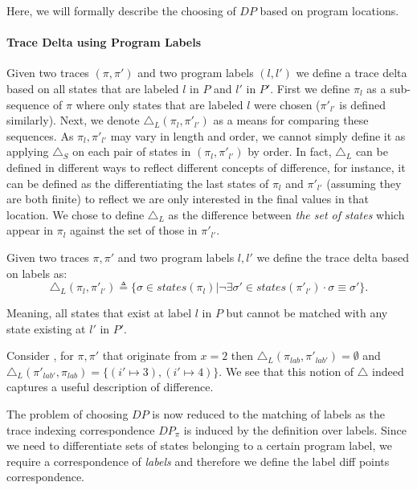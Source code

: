 Here, we will formally describe the choosing of $DP$ based on program locations.

\paragraph{Trace Delta using Program Labels} 
Given two traces $(\pi,\pi')$ and two program labels $(l,l')$ we define a trace delta based on all states that are labeled $l$ in $P$ and $l'$ in $P'$. First we define $\pi_{l}$ as a sub-sequence of $\pi$ where only states that are labeled $l$ were chosen ($\pi'_{l'}$ is defined similarly). Next, we denote $\triangle_L(\pi_{l},\pi'_{l'})$ as a means for comparing these sequences. As $\pi_{l},\pi'_{l'}$ may vary in length and order, we cannot simply define it as applying $\triangle_{S}$ on each pair of states in $(\pi_{l},\pi'_{l'})$ by order. In fact, $\triangle_{L}$ can be defined in different ways to reflect different concepts of difference, for instance, it can be defined as the differentiating the last states of $\pi_{l}$ and $\pi'_{l'}$ (assuming they are both finite) to reflect we are only interested in the final values in that location. We chose to define $\triangle_{L}$ as the difference between \emph{the set of states} which appear in $\pi_{l}$ against the set of those in $\pi'_{l'}$.
\begin{definition}  
Given two traces $\pi,\pi'$ and two program labels $l,l'$ we define the trace delta based on labels as:
\[
\triangle_{L}(\pi_{l},\pi'_{l'}) \triangleq \{ \sigma \in states(\pi_{l}) | \neg \exists \sigma' \in states(\pi'_{l'}) \cdot \sigma \equiv \sigma' \}.
\]
\end{definition}
Meaning, all states that exist at label $l$ in $P$ but cannot be matched with any state existing at $l'$ in $P'$.

\begin{Example}
Consider , for $\pi, \pi'$ that originate from $x=2$  then $\triangle_{L}(\pi_{lab},\pi'_{lab'}) = \emptyset$ and $\triangle_{L}(\pi'_{lab'},\pi_{lab}) = \{ (i' \mapsto 3),(i' \mapsto 4) \}$. We see that this notion of $\triangle$ indeed captures a useful description of difference.
\end{Example}

The problem of choosing $DP$ is now reduced to the matching of labels as the trace indexing correspondence $DP_{\pi}$ is induced by the definition over labels. Since we need to differentiate sets of states belonging to a certain program label, we require a correspondence of \emph{labels} and therefore we define the label diff points correspondence.

